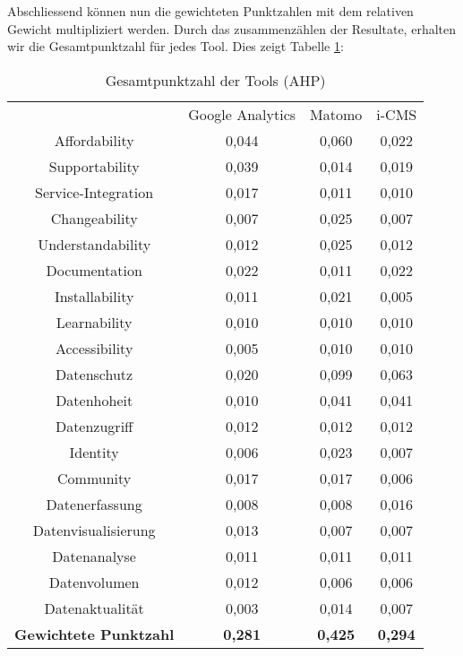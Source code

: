       \newpage
      Abschliessend können nun die gewichteten Punktzahlen mit dem relativen Gewicht multipliziert werden. Durch das zusammenzählen der Resultate, erhalten wir die Gesamtpunktzahl für jedes Tool. Dies zeigt Tabelle \ref{tab:gewPunkt}:
      \begin{table}[h]
        \centering
        \begin{tabular}{cccc}
          & Google Analytics & Matomo & i-CMS \\
          Affordability & 0,044 & 0,060 & 0,022 \\
          Supportability & 0,039 & 0,014 & 0,019 \\
          Service-Integration & 0,017 & 0,011 & 0,010 \\
          Changeability & 0,007 & 0,025 & 0,007 \\
          Understandability & 0,012 & 0,025 & 0,012 \\
          Documentation & 0,022 & 0,011 & 0,022 \\
          Installability & 0,011 & 0,021 & 0,005 \\
          Learnability & 0,010 & 0,010 & 0,010 \\
          Accessibility & 0,005 & 0,010 & 0,010 \\
          Datenschutz & 0,020 & 0,099 & 0,063 \\
          Datenhoheit & 0,010 & 0,041 & 0,041 \\
          Datenzugriff & 0,012 & 0,012 & 0,012 \\
          Identity & 0,006 & 0,023 & 0,007 \\
          Community & 0,017 & 0,017 & 0,006 \\
          Datenerfassung & 0,008 & 0,008 & 0,016 \\
          Datenvisualisierung & 0,013 & 0,007 & 0,007 \\
          Datenanalyse & 0,011 & 0,011 & 0,011 \\
          Datenvolumen & 0,012 & 0,006 & 0,006 \\
          Datenaktualität & 0,003 & 0,014 & 0,007 \\
          \textbf{Gewichtete Punktzahl} & \textbf{0,281} & \textbf{0,425} & \textbf{0,294} \\
          \end{tabular} 
        \caption{Gesamtpunktzahl der Tools (AHP)}
        \label{tab:gewPunkt}
        \end{table}

